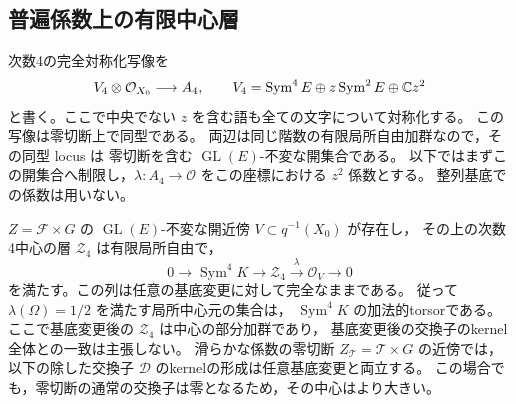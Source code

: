 \subsection{普遍係数上の有限中心層}

次数4の完全対称化写像を
\[
 V_4\otimes\mathcal O_{X_0}\longrightarrow A_4,
 \qquad
 V_4=\operatorname{Sym}^4E\oplus z\operatorname{Sym}^2E\oplus\mathbb C z^2
\]
と書く。ここで中央でない $z$ を含む語も全ての文字について対称化する。
この写像は零切断上で同型である。
両辺は同じ階数の有限局所自由加群なので，その同型 locus は
零切断を含む $\operatorname{GL}(E)$-不変な開集合である。
以下ではまずこの開集合へ制限し，$\lambda:A_4\to\mathcal O$
をこの座標における $z^2$ 係数とする。
整列基底での係数は用いない。

\begin{lemma}[規格化中心元の局所構造]
\label{lem:simultaneous-degree-two-central-torsor}
$Z=\mathcal F\times G$ の $\operatorname{GL}(E)$-不変な開近傍
$V\subset q^{-1}(X_0)$ が存在し，
その上の次数4中心の層 $\mathcal Z_4$ は有限局所自由で，
\begin{equation}\label{eq:simultaneous-degree-two-center-extension}
 0\longrightarrow\operatorname{Sym}^4K
 \longrightarrow\mathcal Z_4
 \xrightarrow{\lambda}\mathcal O_V\longrightarrow0
\end{equation}
を満たす。この列は任意の基底変更に対して完全なままである。
従って $\lambda(\Omega)=1/2$ を満たす局所中心元の集合は，
$\operatorname{Sym}^4K$ の加法的torsorである。
ここで基底変更後の $\mathcal Z_4$ は中心の部分加群であり，
基底変更後の交換子のkernel全体との一致は主張しない。
滑らかな係数の零切断 $Z_{\mathcal T}=\mathcal T\times G$ の近傍では，
以下の除した交換子 $\mathcal D$ のkernelの形成は任意基底変更と両立する。
この場合でも，零切断の通常の交換子は零となるため，その中心はより大きい。
\end{lemma}
